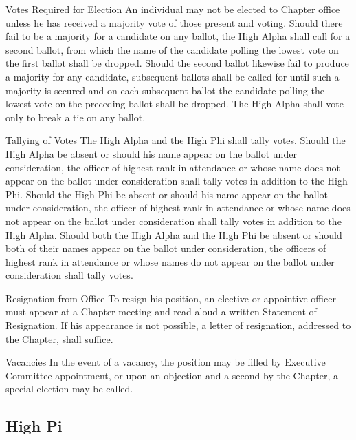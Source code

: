\documentclass{article}
\begin{document}
\begin{subsubsectionList}
  \item {\titleStyle Votes Required for Election\titleSuffix}
  An individual may not be elected to Chapter office unless he has received a
  majority vote of those present and voting. Should there fail to be a majority
  for a candidate on any ballot, the High Alpha shall call for a second ballot,
  from which the name of the candidate polling the lowest vote on the first
  ballot shall be dropped. Should the second ballot likewise fail to produce a
  majority for any candidate, subsequent ballots shall be called for until such
  a majority is secured and on each subsequent ballot the candidate polling the
  lowest vote on the preceding ballot shall be dropped. The High Alpha shall
  vote only to break a tie on any ballot.

  \item {\titleStyle Tallying of Votes\titleSuffix}
  The High Alpha and the High Phi shall tally votes. Should the High Alpha be
  absent or should his name appear on the ballot under consideration, the
  officer of highest rank in attendance or whose name does not appear on the
  ballot under consideration shall tally votes in addition to the High Phi.
  Should the High Phi be absent or should his name appear on the ballot under
  consideration, the officer of highest rank in attendance or whose name does
  not appear on the ballot under consideration shall tally votes in addition to
  the High Alpha. Should both the High Alpha and the High Phi be absent or
  should both of their names appear on the ballot under consideration, the
  officers of highest rank in attendance or whose names do not appear on the
  ballot under consideration shall tally votes.

  \item {\titleStyle Resignation from Office\titleSuffix}
  To resign his position, an elective or appointive officer must appear at a
  Chapter meeting and read aloud a written Statement of Resignation. If his
  appearance is not possible, a letter of resignation, addressed to the Chapter,
  shall suffice.

  \item {\titleStyle Vacancies\titleSuffix}
  In the event of a vacancy, the position may be filled by Executive Committee
  appointment, or upon an objection and a second by the Chapter, a special
  election may be called.
\end{subsubsectionList}

\subsection{High Pi}
\end{document}
